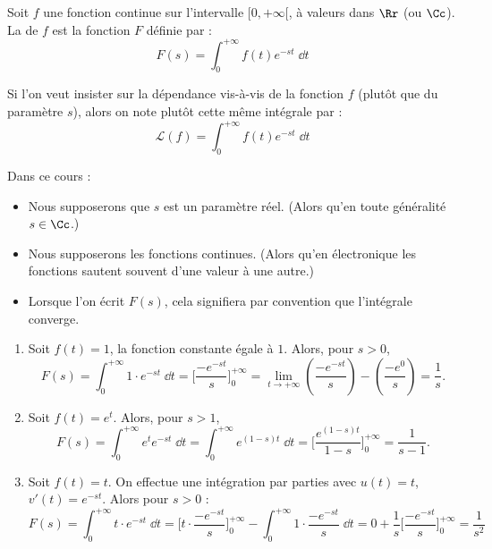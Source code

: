 \documentclass[class=report,crop=false]{standalone}
\begin{document}
\begin{definition}
Soit $f$ une fonction continue sur l'intervalle $[0,+\infty[$, à valeurs dans $\Rr$ (ou $\Cc$).
La  de $f$ est la fonction $F$ définie par :
$$F(s) = \int_0^{+\infty} f(t) e^{-st}\;\dd t$$
\end{definition}

Si l'on veut insister sur la dépendance vis-à-vis de la fonction $f$ 
(plutôt que du paramètre $s$), alors on note plutôt cette même intégrale par :
$$\mathcal{L}(f) = \int_0^{+\infty} f(t) e^{-st}\;\dd t$$

\begin{remarque*}
Dans ce cours :
\begin{itemize}
  \item Nous supposerons que $s$ est un paramètre réel. (Alors qu'en toute généralité $s \in \Cc$.)
  \item Nous supposerons les fonctions continues. (Alors qu'en électronique les fonctions
  sautent souvent d'une valeur à une autre.)
  \item Lorsque l'on écrit $F(s)$, cela signifiera par convention 
  que l'intégrale converge.   
\end{itemize}
\end{remarque*}


\begin{exemple}
\begin{enumerate}
  \item Soit $f(t)=1$, la fonction constante égale à $1$.
  Alors, pour $s>0$,
  $$F(s) = \int_0^{+\infty} 1 \cdot e^{-st}\;\dd t 
  = \Big[ \frac{-e^{-st}}{s} \Big]_0^{+\infty} 
  = \lim_{t\to+\infty}\left( \frac{-e^{-st}}{s} \right)- \left( \frac{-e^{0}}{s} \right) 
  = \frac1s.$$
  
  \item Soit $f(t) = e^t$.
  Alors, pour $s>1$,
  $$F(s) = \int_0^{+\infty} e^te^{-st}\;\dd t 
  = \int_0^{+\infty} e^{(1-s)t}\;\dd t
  = \Big[ \frac{e^{(1-s)t}}{1-s} \Big]_0^{+\infty} 
  = \frac1{s-1}.$$
  
  \item Soit $f(t) = t$.
  On effectue une intégration par parties avec $u(t)=t$, $v'(t) = e^{-st}$. Alors pour $s>0$ :
  $$F(s) = \int_0^{+\infty} t \cdot e^{-st}\;\dd t
  = \Big[ t \cdot \frac{-e^{-st}}{s} \Big]_0^{+\infty} - \int_0^{+\infty} 1 \cdot \frac{-e^{-st}}{s}\;\dd t
  = 0 + \frac1s\Big[ \frac{-e^{-st}}{s} \Big]_0^{+\infty}
  = \frac{1}{s^2}$$
\end{enumerate}  
\end{exemple}
\end{document}
